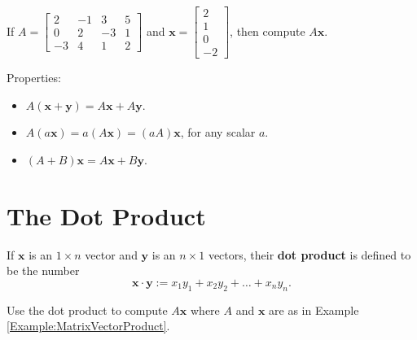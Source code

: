 \documentclass[20pt,a4paper]{extarticle}
\newcounter{example}[section]
\newcounter{definition}[section]
\begin{document}
\begin{example}\label{Example:MatrixVectorProduct}
If $A = \begin{bmatrix} 2 & -1 & 3 & 5 \\ 0 & 2 & -3 & 1 \\ -3 & 4 & 1 & 2 \end{bmatrix}$ and $\mathbf{x} = \begin{bmatrix} 2 \\ 1 \\ 0 \\ -2 \end{bmatrix}$, then compute $A \mathbf{x}$.
\end{example}

\begin{solution}

\end{solution}

\newpage 

Properties:
	\begin{itemize}
		\item $A (\mathbf{x} + \mathbf{y}) = A \mathbf{x} + A \mathbf{y}$.
		\item $A (a\mathbf{x}) = a (A\mathbf{x}) = (aA) \mathbf{x}$, for any scalar $a$.
		\item $(A + B) \mathbf{x} = A\mathbf{x} + B \mathbf{y}$.
	\end{itemize}


\section{The Dot Product}

\begin{definition}
If $\mathbf{x}$ is an $1 \times n$ vector and $\mathbf{y}$ is an $n \times 1$ vectors, their \textbf{dot product} is defined to be the number
	\[
		\mathbf{x} \cdot \mathbf{y} := x_1 y_1 + x_2 y_2 + \ldots + x_n y_n .
	\]
\end{definition}

\begin{example}
Use the dot product to compute $A \mathbf{x}$ where $A$ and $\mathbf{x}$ are as in Example \ref{Example:MatrixVectorProduct}.
\end{example}

\begin{solution}

\end{solution}

\newpage 
\end{document}
